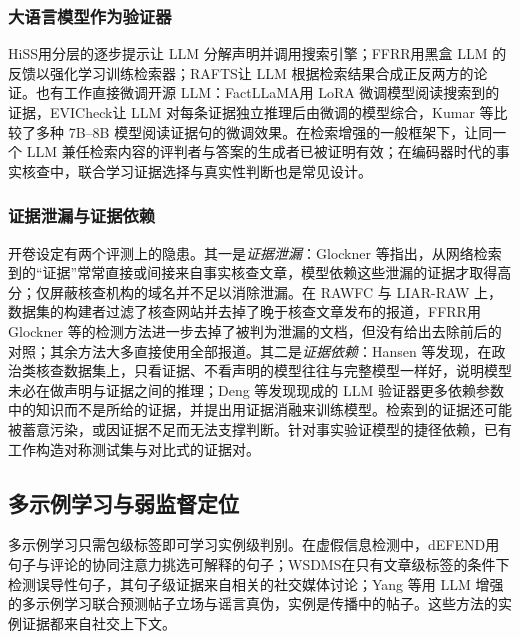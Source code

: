 \subsubsection{大语言模型作为验证器}
HiSS\citep{zhang2023hiss}用分层的逐步提示让 LLM 分解声明并调用搜索引擎；FFRR\citep{zhang2024ffrr}用黑盒 LLM 的反馈以强化学习训练检索器；RAFTS\citep{yue2024rafts}让 LLM 根据检索结果合成正反两方的论证。也有工作直接微调开源 LLM：FactLLaMA\citep{cheung2023factllama}用 LoRA 微调模型阅读搜索到的证据，EVICheck\citep{wang2025evicheck}让 LLM 对每条证据独立推理后由微调的模型综合，Kumar 等\citep{kumar2025entailed}比较了多种 7B--8B 模型阅读证据句的微调效果。在检索增强的一般框架下，让同一个 LLM 兼任检索内容的评判者与答案的生成者已被证明有效\citep{asai2024selfrag,yu2024rankrag}；在编码器时代的事实核查中，联合学习证据选择与真实性判断也是常见设计\citep{fajcik2022claimdissector,wadden2021multivers}。

\subsubsection{证据泄漏与证据依赖}
开卷设定有两个评测上的隐患。其一是\emph{证据泄漏}：Glockner 等\citep{glockner2022missing}指出，从网络检索到的“证据”常常直接或间接来自事实核查文章，模型依赖这些泄漏的证据才取得高分；仅屏蔽核查机构的域名并不足以消除泄漏。在 RAWFC 与 LIAR-RAW 上，数据集的构建者过滤了核查网站并去掉了晚于核查文章发布的报道\citep{yang2022cofced}，FFRR\citep{zhang2024ffrr}用 Glockner 等的检测方法进一步去掉了被判为泄漏的文档，但没有给出去除前后的对照；其余方法大多直接使用全部报道。其二是\emph{证据依赖}：Hansen 等\citep{hansen2021reason}发现，在政治类核查数据集上，只看证据、不看声明的模型往往与完整模型一样好，说明模型未必在做声明与证据之间的推理；Deng 等\citep{deng2026real}发现现成的 LLM 验证器更多依赖参数中的知识而不是所给的证据，并提出用证据消融来训练模型。检索到的证据还可能被蓄意污染\citep{qazi2026glad}，或因证据不足而无法支撑判断\citep{atanasova2022insufficient}。针对事实验证模型的捷径依赖，已有工作构造对称测试集\citep{schuster2019debiasing}与对比式的证据对\citep{schuster2021vitaminc,lee2021crossaug}。

\subsection{多示例学习与弱监督定位}

多示例学习只需包级标签即可学习实例级判别\citep{dietterich1997solving,maron1998framework,ilse2018attention,carbonneau2018mil}。在虚假信息检测中，dEFEND\citep{shu2019defend}用句子与评论的协同注意力挑选可解释的句子；WSDMS\citep{yang2023wsdms}在只有文章级标签的条件下检测误导性句子，其句子级证据来自相关的社交媒体讨论；Yang 等\citep{yang2025llmmil}用 LLM 增强的多示例学习联合预测帖子立场与谣言真伪，实例是传播中的帖子。这些方法的实例证据都来自社交上下文。

